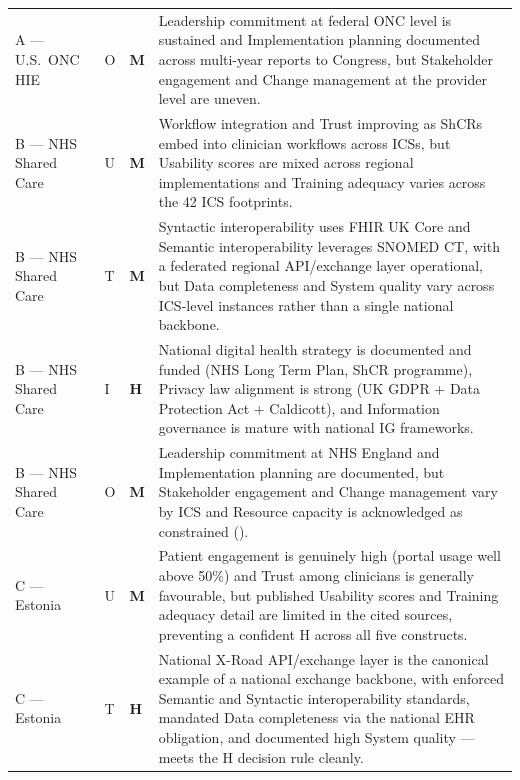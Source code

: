 \begin{longtable}{p{2.8cm} p{0.8cm} >{\centering\arraybackslash}p{1.4cm} p{9.6cm}}
A --- U.S.\ ONC HIE & O & \cellcolor{medamber}\textcolor{medambertext}{\textbf{M}} &
Leadership commitment at federal ONC level is sustained and Implementation planning
documented across multi-year reports to Congress, but Stakeholder engagement and
Change management at the provider level are uneven. \\

\rowcolor{rowgray}
B --- NHS Shared Care & U & \cellcolor{medamber}\textcolor{medambertext}{\textbf{M}} &
Workflow integration and Trust improving as ShCRs embed into clinician workflows
across ICSs, but Usability scores are mixed across regional implementations and
Training adequacy varies across the 42 ICS footprints. \\

B --- NHS Shared Care & T & \cellcolor{medamber}\textcolor{medambertext}{\textbf{M}} &
Syntactic interoperability uses FHIR UK Core and Semantic interoperability leverages
SNOMED CT, with a federated regional API/exchange layer operational, but Data completeness
and System quality vary across ICS-level instances rather than a single national backbone. \\

\rowcolor{rowgray}
B --- NHS Shared Care & I & \cellcolor{highgreen}\textcolor{highgreentext}{\textbf{H}} &
National digital health strategy is documented and funded (NHS Long Term Plan, ShCR
programme), Privacy law alignment is strong (UK GDPR + Data Protection Act + Caldicott),
and Information governance is mature with national IG frameworks. \\

B --- NHS Shared Care & O & \cellcolor{medamber}\textcolor{medambertext}{\textbf{M}} &
Leadership commitment at NHS England and Implementation planning are documented, but
Stakeholder engagement and Change management vary by ICS and Resource capacity is
acknowledged as constrained (\cite{fennelly2020national}). \\

\rowcolor{rowgray}
C --- Estonia & U & \cellcolor{medamber}\textcolor{medambertext}{\textbf{M}} &
Patient engagement is genuinely high (portal usage well above 50\%) and Trust among
clinicians is generally favourable, but published Usability scores and Training adequacy
detail are limited in the cited sources, preventing a confident H across all five
constructs. \\

C --- Estonia & T & \cellcolor{highgreen}\textcolor{highgreentext}{\textbf{H}} &
National X-Road API/exchange layer is the canonical example of a national exchange
backbone, with enforced Semantic and Syntactic interoperability standards, mandated
Data completeness via the national EHR obligation, and documented high System quality
--- meets the H decision rule cleanly. \\


\end{longtable}
